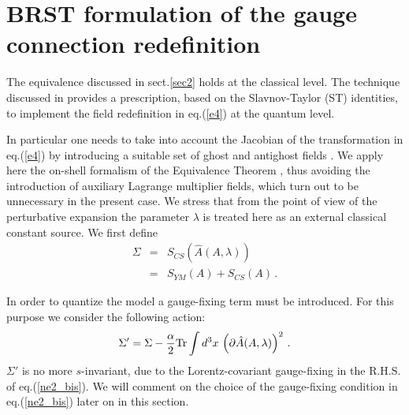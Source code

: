 \documentclass[a4paper,11pt]{article}
\begin{document}
\section{BRST formulation of the gauge connection redefinition}
\label{sec3}

The equivalence discussed in sect.\ref{sec2} holds at the classical level.
The technique discussed in \cite{ET} provides a prescription, based on the
Slavnov-Taylor (ST) identities, to implement the field redefinition in eq.(\ref{e4})
at the quantum level.

In particular one needs to take into account the Jacobian of the
transformation in eq.(\ref{e4}) by introducing a suitable set of 
ghost and antighost fields \cite{ET}. 
We apply here the on-shell formalism of the Equivalence Theorem \cite{ET},
thus avoiding the introduction of auxiliary Lagrange multiplier fields,
which turn out to be unnecessary in the present case.
We stress that from the point of view of the
perturbative expansion the parameter $\lambda$ is treated here as an external
classical constant source.
We first define
%
\begin{eqnarray}
\Sigma & = & S_{CS}(\hat A(A,\lambda)) 
             \nonumber \\
       & = & S_{YM}(A) + S_{CS}(A) \, .
\label{ne2}
\end{eqnarray}
%

%
In order to quantize the model a gauge-fixing term must be introduced.
For this purpose we consider the following action:
%
\begin{eqnarray}
\Sigma' = \Sigma -\frac{\alpha}{2} {\rm Tr} \int d^3x \, 
\left ( \partial \hat A(A,\lambda) \right )^2 \, .
\label{ne2_bis}
\end{eqnarray}
%
$\Sigma'$ is no more $s$-invariant, due to the Lorentz-covariant gauge-fixing
in the R.H.S. of eq.(\ref{ne2_bis}).
We will comment on the choice of the gauge-fixing condition in eq.(\ref{ne2_bis})
later on in this section.
\end{document}
